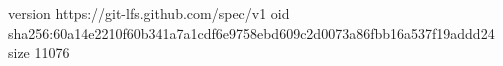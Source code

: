 version https://git-lfs.github.com/spec/v1
oid sha256:60a14e2210f60b341a7a1cdf6e9758ebd609c2d0073a86fbb16a537f19addd24
size 11076
